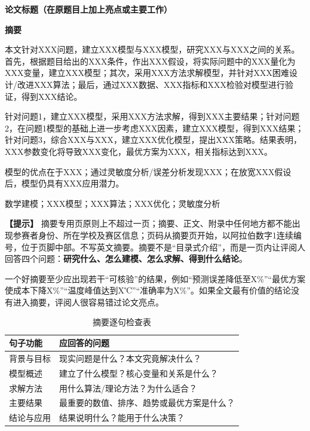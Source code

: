 \documentclass[12pt,a4paper]{article}
\newcommand{\tip}[1]{\par\noindent\textbf{【提示】} #1\par}
\begin{document}
\setcounter{page}{1}

\begin{center}
{\bfseries 论文标题（在原题目上加上亮点或主要工作）}

\vspace{2ex}
{\bfseries 摘要}
\end{center}

本文针对XXX问题，建立XXX模型与XXX模型，研究XXX与XXX之间的关系。首先，根据题目给出的XXX条件，作出XXX假设，将实际问题中的XXX量化为XXX变量，建立XXX模型；其次，采用XXX方法求解模型，并针对XXX困难设计/改进XXX算法；最后，通过XXX数据、XXX指标和XXX检验对模型进行验证，得到XXX结论。

针对问题1，建立XXX模型，采用XXX方法求解，得到XXX主要结果；针对问题2，在问题1模型的基础上进一步考虑XXX因素，建立XXX模型，得到XXX结果；针对问题3，综合XXX与XXX，建立XXX优化模型，提出XXX策略。结果表明，XXX参数变化将导致XXX变化，最优方案为XXX，相关指标达到XXX。

模型的优点在于XXX；通过灵敏度分析/误差分析发现XXX；在放宽XXX假设后，模型仍具有XXX应用潜力。

\vspace{2ex}
 数学建模；XXX模型；XXX算法；XXX优化；灵敏度分析

\vspace{2ex}
\tip{摘要专用页原则上不超过一页；摘要、正文、附录中任何地方都不能出现参赛者身份、所在学校及赛区信息；页码从摘要页开始，以阿拉伯数字1连续编号，位于页脚中部。不写英文摘要。摘要不是“目录式介绍”，而是一页内让评阅人回答四个问题：\textbf{研究什么、怎么建模、怎么求解、得到什么结论}。  

一个好摘要至少应出现若干“可核验”的结果，例如“预测误差降低至X\%”“最优方案使成本下降X\%”“温度峰值达到X℃”“准确率为X\%”。如果全文最有价值的结论没有进入摘要，评阅人很容易错过论文亮点。}

\begin{table}[H]
\centering
\caption{摘要逐句检查表}
\begin{tabular}{p{2.8cm}p{10.5cm}}
\toprule
句子功能 & 应回答的问题 \\
\midrule
背景与目标 & 现实问题是什么？本文究竟解决什么？ \\
模型概述 & 建立了什么模型？核心变量和关系是什么？ \\
求解方法 & 用什么算法/理论方法？为什么适合？ \\
主要结果 & 最重要的数值、排序、趋势或最优方案是什么？ \\
结论与应用 & 结果说明什么？能用于什么决策？ \\
\bottomrule
\end{tabular}
\end{table}
\end{document}
